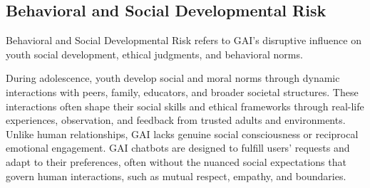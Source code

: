 % 

\vspace{-8pt}
\subsection{Behavioral and Social Developmental Risk}
\begin{boxH}
Behavioral and Social Developmental Risk refers to GAI’s disruptive influence on youth social development, ethical judgments, and behavioral norms.

\end{boxH}
During adolescence, youth develop social and moral norms through dynamic interactions with peers, family, educators, and broader societal structures. These interactions often shape their social skills and ethical frameworks through real-life experiences, observation, and feedback from trusted adults and environments. Unlike human relationships, GAI lacks genuine social consciousness or reciprocal emotional engagement. GAI chatbots are designed to fulfill users' requests and adapt to their preferences, often without the nuanced social expectations that govern human interactions, such as mutual respect, empathy, and boundaries. 


